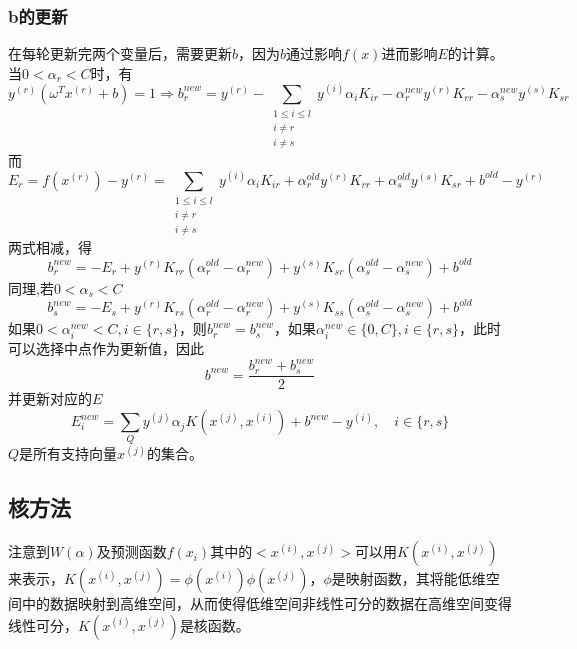 \documentclass[supercite]{upcthesis}
\begin{document}
\subsubsection{b的更新}
在每轮更新完两个变量后，需要更新$b$\cite{李航2012统计学习方法}，因为$b$通过影响$f(x)$进而影响$E$的计算。
当$0<\alpha_{r}<C$时，有
\begin{equation}
y^{(r)}(\omega^Tx^{(r)}+b)=1 \Rightarrow b_{r}^{new}=y^{(r)}-\sum_{\substack{1 \leq i \leq l \\ i\neq r\\i \neq s }}y^{(i)}\alpha_{i}K_{ir}-\alpha_{r}^{new}y^{(r)}K_{rr}-\alpha_{s}^{new}y^{(s)}K_{sr}
\end{equation}
而
\begin{equation}
E_{r}=f(x^{(r)})-y^{(r)}=\sum_{\substack{1 \leq i \leq l \\ i\neq r\\i \neq s }}y^{(i)}\alpha_{i}K_{ir}+\alpha_{r}^{old}y^{(r)}K_{rr}+\alpha_{s}^{old}y^{(s)}K_{sr}+b^{old}-y^{(r)}
\end{equation}
两式相减，得
\begin{equation}
b_r^{new}=-E_r+y^{(r)}K_{rr}(\alpha_{r}^{old}-\alpha_{r}^{new})+y^{(s)}K_{sr}(\alpha_{s}^{old}-\alpha_{s}^{new})+b^{old}
\end{equation}
同理,若$0<\alpha_{s}<C$
\begin{equation}
b_s^{new}=-E_s+y^{(r)}K_{rs}(\alpha_{r}^{old}-\alpha_{r}^{new})+y^{(s)}K_{ss}(\alpha_{s}^{old}-\alpha_{s}^{new})+b^{old}
\end{equation}
如果$0<\alpha_{i}^{new}<C,i\in\{r,s\}$，则$b_r^{new}=b_s^{new}$，如果$\alpha_{i}^{new}\in\{0,C\},i\in\{r,s\}$，此时可以选择中点作为更新值，因此
\begin{equation}
b^{new}=\frac{b_{r}^{new}+b_{s}^{new}}{2}
\end{equation}
并更新对应的$E$
\begin{equation}
E_{i}^{new}=\sum_Qy^{(j)}\alpha_{j}K(x^{(j)},x^{(i)})+b^{new}-y^{(i)},\quad i\in\{r,s\}
\end{equation}
$Q$是所有支持向量$x^{(j)}$的集合。
\subsection{核方法}
注意到$W(\alpha)$及预测函数$f(x_i)$其中的$<x^{(i)},x^{(j)}>$可以用$K(x^{(i)},x^{(j)})$来表示，$K(x^{(i)},x^{(j)})=\phi(x^{(i)})\phi(x^{(j)})$，$\phi$是映射函数，其将能低维空间中的数据映射到高维空间，从而使得低维空间非线性可分的数据在高维空间变得线性可分，$K(x^{(i)},x^{(j)})$是核函数。
\end{document}
